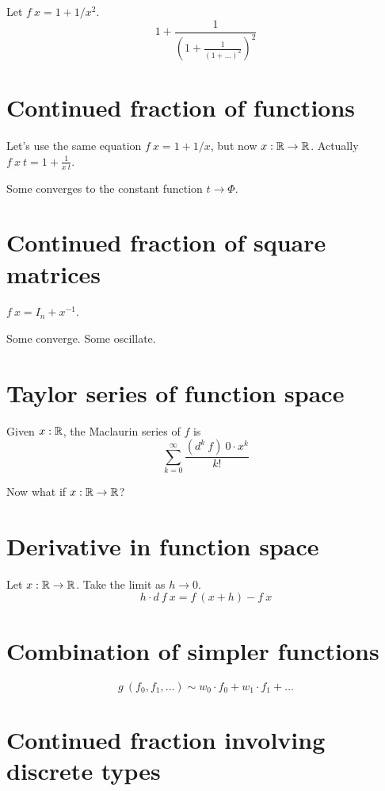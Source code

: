 Let \(f~x = 1 + 1/x^2\).
\[
    1 + \frac{1}{\left(1 + \frac{1}{(1+\ldots)^2}\right)^2}
\]

\section{Continued fraction of functions}

Let's use the same equation \(f~x = 1 + 1/x\),
but now \(x : \mathbb{R} \to \mathbb{R}\).
Actually \(f~x~t = 1 + \frac{1}{x~t}\).

Some converges to the constant function \(t \to \Phi\).

\section{Continued fraction of square matrices}

\(f~x = I_n + x^{-1}\).

Some converge. Some oscillate.

\section{Taylor series of function space}

Given \(x : \mathbb{R}\),
the Maclaurin series of \(f\) is
\[
    \sum_{k=0}^{\infty} \frac{(d^k~f)~0 \cdot x^k}{k!}
\]

Now what if \(x : \mathbb{R} \to \mathbb{R}\)?

\section{Derivative in function space}

Let \(x : \mathbb{R} \to \mathbb{R}\).
Take the limit as \(h \to 0\).
\[
    h \cdot d~f~x = f~(x + h) - f~x
\]


\section{Combination of simpler functions}

\[
    g~(f_0,f_1,\ldots) \sim w_0 \cdot f_0 + w_1 \cdot f_1 + \ldots
\]

\section{Continued fraction involving discrete types}

